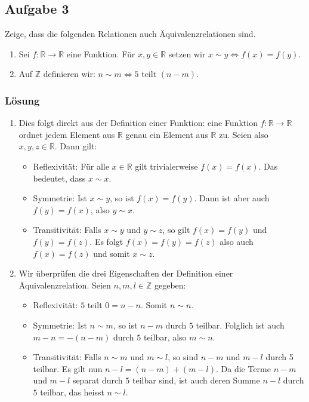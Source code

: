 \documentclass[a4paper,10pt]{article}
\newcommand{\Z}{\mathbb{Z}}
\newcommand{\R}{\mathbb{R}}
\newcommand{\s}[1]{#1}
\begin{document}
\subsection*{Aufgabe 3}

Zeige, dass die folgenden Relationen auch Äquivalenzrelationen sind.
\begin{enumerate}[label=(\alph*)]
    \item Sei $f:\R \to \R$ eine Funktion. Für $x,y\in \R$ setzen wir $x\sim y \iff f(x)=f(y)$.
    \item Auf $\Z$ definieren wir: $n\sim m \iff 5$ teilt $(n-m)$.
\end{enumerate}

\s{\subsubsection*{Lösung}
\begin{enumerate}[label=(\alph*)]
    \item Dies folgt direkt aus der Definition einer Funktion: eine Funktion $f:\R\to \R$ ordnet jedem Element aus $\R$ genau ein Element aus $\R$ zu. Seien also $x,y,z\in \R$. Dann gilt:
    \begin{itemize}
        \item Reflexivität: Für alle $x\in \R$ gilt trivialerweise $f(x)=f(x)$. Das bedeutet, dass $x\sim x$.
        \item Symmetrie: Ist $x\sim y$, so ist $f(x)=f(y)$. Dann ist aber auch $f(y)=f(x)$, also $y\sim x$.
        \item Transitivität: Falls $x\sim y$ und $y\sim z$, so gilt $f(x)=f(y)$ und $f(y)=f(z)$. Es folgt $f(x)=f(y)=f(z)$ also auch $f(x)=f(z)$ und somit $x\sim z$.
    \end{itemize}
    \item Wir überprüfen die drei Eigenschaften der Definition einer Äquivalenzrelation. Seien $n,m,l\in \Z$ gegeben:
    \begin{itemize}
        \item Reflexivität: $5$ teilt $0=n-n$. Somit $n\sim n$.
        \item Symmetrie: Ist $n\sim m$, so ist $n-m$ durch $5$ teilbar. Folglich ist auch $m-n=-(n-m)$ durch $5$ teilbar, also $m\sim n$.
        \item Transitivität: Falls $n\sim m$ und $m\sim l$, so sind $n-m$ und $m-l$ durch 5 teilbar. Es gilt nun $n-l=(n-m)+(m-l)$. Da die Terme $n-m$ und $m-l$ separat durch $5$ teilbar sind, ist auch deren Summe $n-l$ durch $5$ teilbar, das heisst $n\sim l$.
    \end{itemize}
    \end{enumerate}
}
\end{document}
